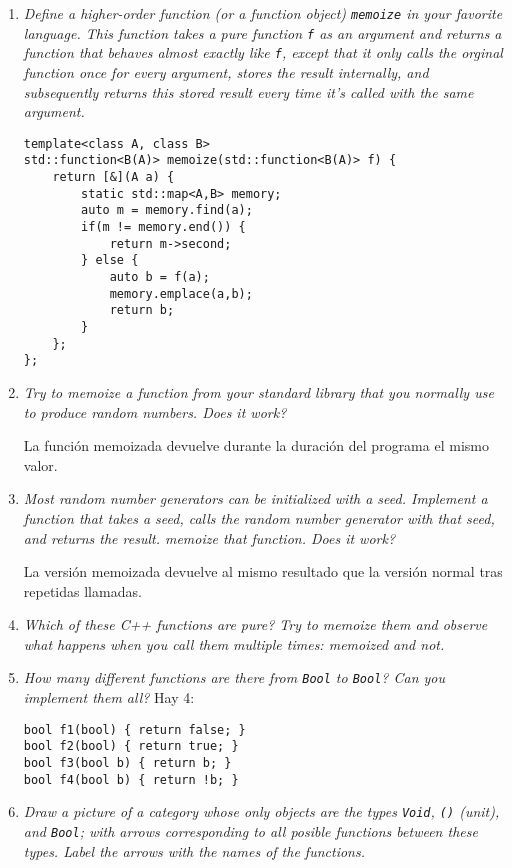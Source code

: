 \documentclass[11pt]{article}
\begin{document}
\begin{enumerate}
\item \textit{Define a higher-order function (or a function object) \texttt{memoize} in your favorite language. This function takes a pure function \texttt{f} as an argument and returns a function that behaves almost exactly like \texttt{f}, except that it only calls the orginal function once for every argument, stores the result internally, and subsequently returns this stored result every time it's called with the same argument.}

\begin{lstlisting}
template<class A, class B>
std::function<B(A)> memoize(std::function<B(A)> f) {
	return [&](A a) {
		static std::map<A,B> memory;
		auto m = memory.find(a);
		if(m != memory.end()) {
			return m->second;
		} else {
			auto b = f(a);
			memory.emplace(a,b);
			return b;
		}
	};
};
\end{lstlisting}

\item \textit{Try to memoize a function from your standard library that you normally use to produce random numbers. Does it work?}

La función memoizada devuelve durante la duración del programa el mismo valor.

\item \textit{Most random number generators can be initialized with a seed. Implement a function that takes a seed, calls the random number generator with that seed, and returns the result. memoize that function. Does it work?}

La versión memoizada devuelve al mismo resultado que la versión normal tras repetidas llamadas.

\item \textit{Which of these C++ functions are pure? Try to memoize them and observe what happens when you call them multiple times: memoized and not.}

\item \textit{How many different functions are there from \texttt{Bool} to \texttt{Bool}? Can you implement them all?}
Hay 4:
\begin{lstlisting}
bool f1(bool) { return false; }
bool f2(bool) { return true; }
bool f3(bool b) { return b; }
bool f4(bool b) { return !b; }
\end{lstlisting}

\item \textit{Draw a picture of a category whose only objects are the types \texttt{Void}, \texttt{()} (unit), and \texttt{Bool}; with arrows corresponding to all posible functions between these types. Label the arrows with the names of the functions.}

\end{enumerate}
\end{document}
